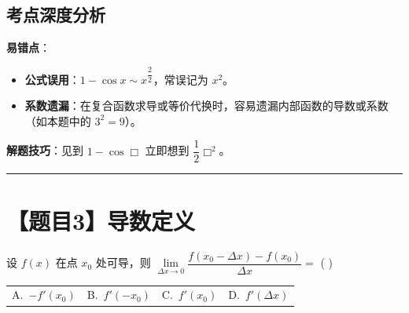 \documentclass[UTF8,10pt]{ctexart}
\makeatletter
\newenvironment{redenv}{\color{red}}{}
\newenvironment{conceptbox}{%
    \begin{tcolorbox}[colback=red!5, colframe=red!50!black, title=概念解析, fonttitle=\bfseries, top=2pt, bottom=2pt, left=2pt, right=2pt]
}{%
    \end{tcolorbox}
}
\newcommand{\problemrule}{\par\filbreak\noindent\rule{\textwidth}{1.5pt}\vspace{-0.5em}}
\newcommand{\fourchoices}[4]{
    \par\noindent
    \begin{tabular*}{\linewidth}{@{\extracolsep{\fill}}llll}
        A.~#1 & B.~#2 & C.~#3 & D.~#4
    \end{tabular*}
}
\makeatother
\begin{document}
\begin{redenv}
\subsection*{考点深度分析}
\begin{conceptbox}
\textbf{易错点}：
\begin{itemize}
    \item \textbf{公式误用}：$1-\cos x \sim x^\dfrac{2}{2}$，常误记为 $x^2$。
    \item \textbf{系数遗漏}：在复合函数求导或等价代换时，容易遗漏内部函数的导数或系数（如本题中的 $3^2=9$）。
\end{itemize}
\textbf{解题技巧}：见到 $1-\cos \Box$ 立即想到 $\dfrac{1}{2}\Box^2$。
\end{conceptbox}
\end{redenv}

\problemrule
\section*{【题目3】导数定义}
设 $f(x)$ 在点 $x_0$ 处可导，则 $\lim\limits_{\Delta x \to 0} \dfrac{f(x_0-\Delta x)-f(x_0)}{\Delta x} = $ ( \quad )
\fourchoices{$-f'(x_0)$}{$f'(-x_0)$}{$f'(x_0)$}{$f'(\Delta x)$}
\end{document}
